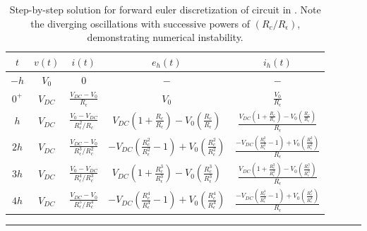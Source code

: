 \begin{table}[h!]
\centering
\renewcommand{\arraystretch}{2.5}
\setlength{\tabcolsep}{12pt}
\begin{tabular}{|c|c|c|c|c|}
\hline
\rowcolor{warmPink}
	\textbf{\color{white}$t$} & \textbf{\color{white}$v(t)$} & \textbf{\color{white}$i(t)$} & \textbf{\color{white}$e_h(t)$} & \textbf{\color{white}$i_h(t)$} \\[1ex]
\hline
\rowcolor{lightPink}
    $-h$ & $V_0$ & $0$ & $-$ & $-$ \\[1ex]
\hline
    $0^+$ & $V_{DC}$ & $\displaystyle\frac{V_{DC} - V_0}{R_\epsilon}$ & $V_0$ & $\displaystyle\frac{V_0}{R_\epsilon}$ \\[1ex]
\hline
\rowcolor{lightPink}
    $h$ & $V_{DC}$ & $\displaystyle\frac{V_0 - V_{DC}}{R_\epsilon^2/R_c}$ & $V_{DC}\left(1 + \frac{R_c}{R_\epsilon}\right) - V_0\left(\frac{R_c}{R_\epsilon}\right)$ & $\displaystyle\frac{V_{DC}\left(1 + \frac{R_c}{R_\epsilon}\right) - V_0\left(\frac{R_c}{R_\epsilon}\right)}{R_\epsilon}$ \\[1ex]
\hline
    $2h$ & $V_{DC}$ & $\displaystyle\frac{V_{DC} - V_0}{R_\epsilon^3/R_c^2}$ & $-V_{DC}\left(\frac{R_c^2}{R_\epsilon^2} - 1\right) + V_0\left(\frac{R_c^2}{R_\epsilon^2}\right)$ & $\displaystyle\frac{-V_{DC}\left(\frac{R_c^2}{R_\epsilon^2} - 1\right) + V_0\left(\frac{R_c^2}{R_\epsilon^2}\right)}{R_\epsilon}$ \\[1ex]
\hline
\rowcolor{lightPink}
    $3h$ & $V_{DC}$ & $\displaystyle\frac{V_0 - V_{DC}}{R_\epsilon^4/R_c^3}$ & $V_{DC}\left(1 + \frac{R_c^3}{R_\epsilon^3}\right) - V_0\left(\frac{R_c^3}{R_\epsilon^3}\right)$ & $\displaystyle\frac{V_{DC}\left(1 + \frac{R_c^3}{R_\epsilon^3}\right) - V_0\left(\frac{R_c^3}{R_\epsilon^3}\right)}{R_\epsilon}$ \\[1ex]
\hline
    $4h$ & $V_{DC}$ & $\displaystyle\frac{V_{DC} - V_0}{R_\epsilon^5/R_c^4}$ & $-V_{DC}\left(\frac{R_c^4}{R_\epsilon^4} - 1\right) + V_0\left(\frac{R_c^4}{R_\epsilon^4}\right)$ & $\displaystyle\frac{-V_{DC}\left(\frac{R_c^4}{R_\epsilon^4} - 1\right) + V_0\left(\frac{R_c^4}{R_\epsilon^4}\right)}{R_\epsilon}$ \\[1ex]
\hline
\end{tabular}
\caption{Step-by-step solution for forward euler discretization of circuit in . Note the diverging oscillations with successive powers of $(R_c/R_\epsilon)$, demonstrating numerical instability.}
\label{tab:fe_solution_ckt_a}
\end{table}

\vspace{1em}
\noindent\rule{\textwidth}{0.4pt}